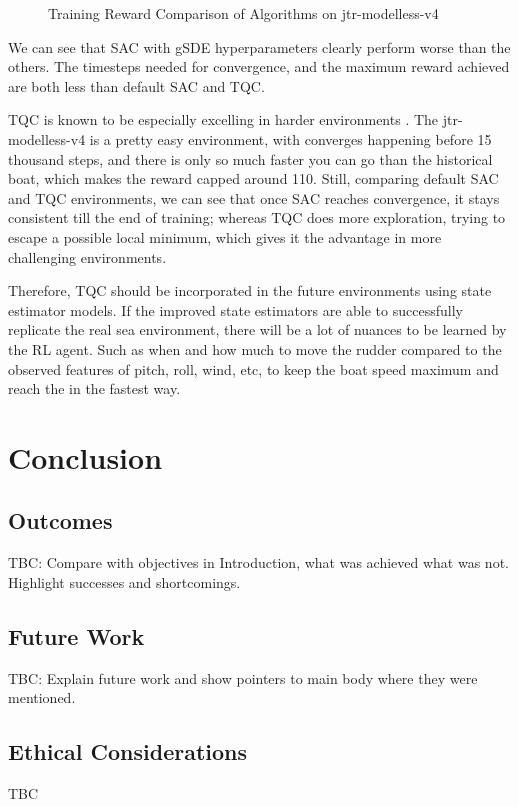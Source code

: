 \documentclass[12pt,twoside]{report}
\begin{document}
\begin{figure}[h]
\begin{subfigure}[b]{0.48\textwidth}
    \end{subfigure}
    \caption{Training Reward Comparison of Algorithms on jtr-modelless-v4}
    \label{fig:rl-comparison}
\end{figure}

We can see that SAC with gSDE hyperparameters clearly perform worse than the others. The timesteps needed for convergence, and the maximum reward achieved are both less than default SAC and TQC. 

TQC is known to be especially excelling in harder environments \cite{tqc-paper}. The jtr-modelless-v4 is a pretty easy environment, with converges happening before 15 thousand steps, and there is only so much faster you can go than the historical boat, which makes the reward capped around 110. Still, comparing default SAC and TQC environments, we can see that once SAC reaches convergence, it stays consistent till the end of training; whereas TQC does more exploration, trying to escape a possible local minimum, which gives it the advantage in more challenging environments. 

Therefore, TQC should be incorporated in the future environments using state estimator models. If the improved state estimators are able to successfully replicate the real sea environment, there will be a lot of nuances to be learned by the RL agent. Such as when and how much to move the rudder compared to the observed features of pitch, roll, wind, etc, to keep the boat speed maximum and reach the in the fastest way.

\chapter{Conclusion}

\section{Outcomes}
TBC: Compare with objectives in Introduction, what was achieved what was not. Highlight successes and shortcomings.

\section{Future Work}
TBC: Explain future work and show pointers to main body where they were mentioned.

\section{Ethical Considerations}
TBC
\end{document}
